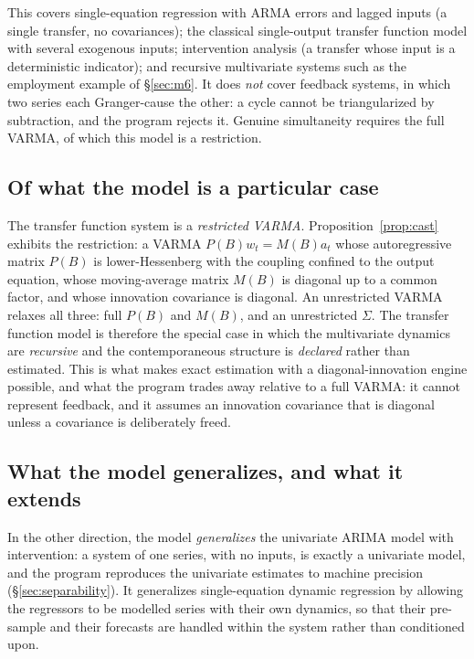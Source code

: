 \documentclass[11pt,a4paper]{article}
\theoremstyle{plain}
\theoremstyle{remark}
\begin{document}
\noindent
This covers single-equation regression with ARMA errors and lagged inputs (a single
transfer, no covariances); the classical single-output transfer function model with
several exogenous inputs; intervention analysis (a transfer whose input is a
deterministic indicator); and recursive multivariate systems such as the employment
example of \S\ref{sec:m6}. It does \emph{not} cover feedback systems, in which two
series each Granger-cause the other: a cycle cannot be triangularized by subtraction,
and the program rejects it. Genuine simultaneity requires the full VARMA, of which
this model is a restriction.

\subsection{Of what the model is a particular case}

The transfer function system is a \emph{restricted VARMA}. Proposition~\ref{prop:cast}
exhibits the restriction: a VARMA $P(B)w_t=M(B)a_t$ whose autoregressive matrix
$P(B)$ is lower-Hessenberg with the coupling confined to the output equation, whose
moving-average matrix $M(B)$ is diagonal up to a common factor, and whose innovation
covariance is diagonal. An unrestricted VARMA relaxes all three: full $P(B)$ and
$M(B)$, and an unrestricted $\Sigma$. The transfer function model is therefore the
special case in which the multivariate dynamics are \emph{recursive} and the
contemporaneous structure is \emph{declared} rather than estimated. This is what
makes exact estimation with a diagonal-innovation engine possible, and what the
program trades away relative to a full VARMA: it cannot represent feedback, and it
assumes an innovation covariance that is diagonal unless a covariance is deliberately
freed.

\subsection{What the model generalizes, and what it extends}

In the other direction, the model \emph{generalizes} the univariate ARIMA model with
intervention: a system of one series, with no inputs, is exactly a univariate model,
and the program reproduces the univariate estimates to machine precision
(\S\ref{sec:separability}). It generalizes single-equation dynamic regression by
allowing the regressors to be modelled series with their own dynamics, so that their
pre-sample and their forecasts are handled within the system rather than conditioned
upon.
\end{document}
